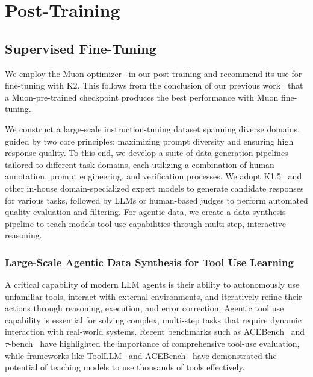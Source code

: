 \section{Post-Training}


\subsection{Supervised Fine-Tuning}

We employ the Muon optimizer~\citep{jordan2024muon} in our post-training and recommend its use for fine-tuning with K2. This follows from the conclusion of our previous work~\cite{liu2025muon} that a Muon-pre-trained checkpoint produces the best performance with Muon fine-tuning.

We construct a large-scale instruction-tuning dataset spanning diverse domains, guided by two core principles: maximizing prompt diversity and ensuring high response quality. To this end, we develop a suite of data generation pipelines tailored to different task domains, each utilizing a combination of human annotation, prompt engineering, and verification processes.
We adopt K1.5~\citep{team2025kimi} and other in-house domain-specialized expert models to generate candidate responses for various tasks, followed by LLMs or human-based judges to perform automated quality evaluation and filtering.
For agentic data, we create a data synthesis pipeline to teach models tool-use capabilities through multi-step, interactive reasoning. 


\subsubsection{Large-Scale Agentic Data Synthesis for Tool Use Learning}
\label{sec:agentic-data-synthesis}

A critical capability of modern LLM agents is their ability to autonomously use unfamiliar tools, interact with external environments, and iteratively refine their actions through reasoning, execution, and error correction. Agentic tool use capability is essential for solving complex, multi-step tasks that require dynamic interaction with real-world systems. Recent benchmarks such as ACEBench~\citep{chen2025acebench} and $\tau$-bench~\citep{yao2024tau} have highlighted the importance of comprehensive tool-use evaluation, while frameworks like ToolLLM~\citep{qin2023toolllm} and ACEBench~\citep{chen2025acebench} have demonstrated the potential of teaching models to use thousands of tools effectively.

